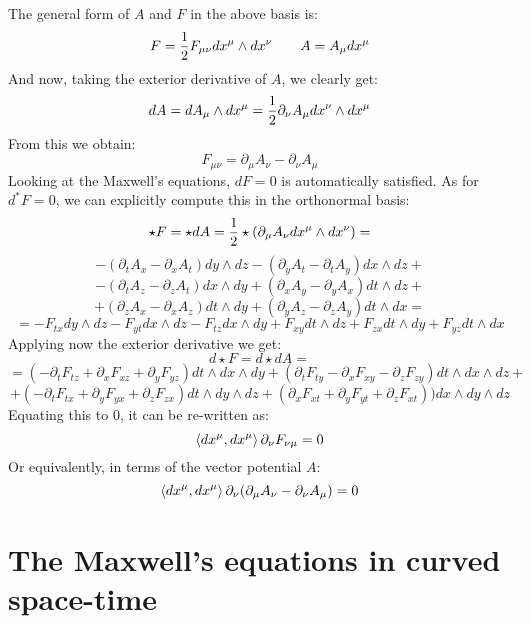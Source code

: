 \documentclass[12pt,a4paper]{report}
\theoremstyle{definition}
\theoremstyle{Theorem}
\theoremstyle{definition}
\theoremstyle{definition}
\begin{document}
	The general form of $A$ and $F$ in the above basis is:
	$$F={1\over 2}F_{\mu\nu}dx^\mu\wedge dx^\nu\hspace{20 pt} A=A_\mu dx^\mu$$
	And now, taking the exterior derivative of $A$, we clearly get:
	$$dA=dA_\mu\wedge dx^\mu={1\over 2}\partial_\nu A_\mu dx^\nu\wedge dx^\mu$$
	From this we obtain:
	$$F_{\mu\nu}=\partial_\mu A_\nu-\partial_\nu A_\mu$$
	Looking at the Maxwell's equations, $dF=0$ is automatically satisfied. As for $d^*F=0$, we can explicitly compute this in the orthonormal basis:
	$$\star F=\star dA={1\over 2}\star(\partial_\mu A_\nu dx^\mu\wedge dx^\nu)=$$
	$$-(\partial_tA_x-\partial_x A_t)dy\wedge dz-(\partial_yA_t-\partial_t A_y)dx\wedge dz+$$
	$$-(\partial_t A_z-\partial_z A_t)dx\wedge dy+(\partial_x A_y-\partial_y A_x)dt\wedge dz+$$
	$$+(\partial_z A_x-\partial_x A_z)dt\wedge dy+(\partial_y A_z-\partial_z A_y)dt\wedge dx=$$
	$$=-F_{tx} dy\wedge dz- F_{yt}dx\wedge dz -F_{tz}dx\wedge dy+F_{xy}dt\wedge dz+F_{zx}dt\wedge dy+F_{yz}dt\wedge dx$$
	Applying now the exterior derivative we get:
	$$d\star F=d\star dA=$$
	$$=(-\partial_t F_{tz}+\partial_xF_{xz}+\partial_y F_{yz})dt\wedge dx\wedge dy+(\partial_t F_{ty}-\partial_x F_{xy}-\partial_z F_{zy})dt\wedge dx\wedge dz+$$
	$$+(-\partial_t F_{tx}+\partial_yF_{yx}+\partial_z F_{zx})dt\wedge dy\wedge dz +(\partial_xF_{xt}+\partial_yF_{yt}+\partial_zF_{xt}))dx\wedge dy\wedge dz$$
	Equating this to 0, it can be re-written as:
	$$\braket{dx^\mu,dx^\mu}\partial_\nu F_{\nu\mu}=0$$
	Or equivalently, in terms of the vector potential $A$:
	$$\braket{dx^\mu,dx^\mu}\partial_\nu (\partial_\mu A_\nu-\partial_\nu A_\mu)=0$$
	\section{The Maxwell's equations in curved space-time}
\end{document}
